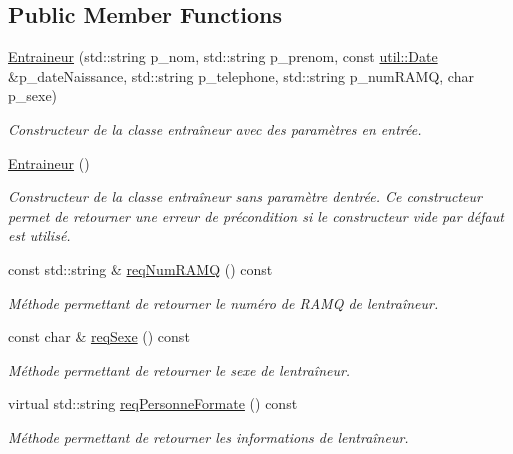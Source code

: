 \subsection*{Public Member Functions}
\begin{DoxyCompactItemize}
\item 
\hyperlink{classhockey_1_1Entraineur_a707fdafbb52daf320baf757f7d7c460f}{Entraineur} (std\+::string p\+\_\+nom, std\+::string p\+\_\+prenom, const \hyperlink{classutil_1_1Date}{util\+::\+Date} \&p\+\_\+date\+Naissance, std\+::string p\+\_\+telephone, std\+::string p\+\_\+num\+R\+A\+MQ, char p\+\_\+sexe)
\begin{DoxyCompactList}\small\item\em Constructeur de la classe entraîneur avec des paramètres en entrée. \end{DoxyCompactList}\item 
\mbox{\label{classhockey_1_1Entraineur_a4dff2cf754acea2fbc3a510146618de9}} 
\hyperlink{classhockey_1_1Entraineur_a4dff2cf754acea2fbc3a510146618de9}{Entraineur} ()
\begin{DoxyCompactList}\small\item\em Constructeur de la classe entraîneur sans paramètre d\textquotesingle{}entrée. Ce constructeur permet de retourner une erreur de précondition si le constructeur vide par défaut est utilisé. \end{DoxyCompactList}\item 
const std\+::string \& \hyperlink{classhockey_1_1Entraineur_a7f9bb4ef1197e785be0cd7e506f26bbd}{req\+Num\+R\+A\+MQ} () const
\begin{DoxyCompactList}\small\item\em Méthode permettant de retourner le numéro de R\+A\+MQ de l\textquotesingle{}entraîneur. \end{DoxyCompactList}\item 
const char \& \hyperlink{classhockey_1_1Entraineur_a8bd3cd9717f896085b74782e5b1170fc}{req\+Sexe} () const
\begin{DoxyCompactList}\small\item\em Méthode permettant de retourner le sexe de l\textquotesingle{}entraîneur. \end{DoxyCompactList}\item 
virtual std\+::string \hyperlink{classhockey_1_1Entraineur_a376149c10b8541c45d703682d41d80f3}{req\+Personne\+Formate} () const
\begin{DoxyCompactList}\small\item\em Méthode permettant de retourner les informations de l\textquotesingle{}entraîneur. \end{DoxyCompactList}\item 

\end{DoxyCompactItemize}
